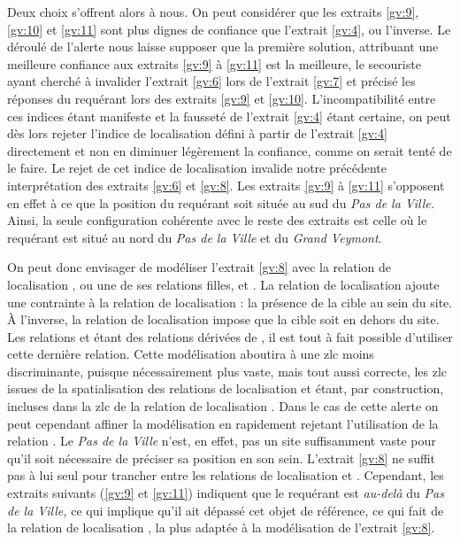 Deux choix s'offrent alors à nous. On peut considérer que les extraits
\ref{gv:9}, \ref{gv:10} et \ref{gv:11} sont plus dignes de confiance
que l'extrait \ref{gv:4}, ou l'inverse. Le déroulé de l'alerte nous
laisse supposer que la première solution, attribuant une meilleure
confiance aux extraits \ref{gv:9} à \ref{gv:11} est la meilleure, le
secouriste ayant cherché à invalider l'extrait \ref{gv:6} lors de
l'extrait \ref{gv:7} et précisé les réponses du requérant lors des
extraits \ref{gv:9} et \ref{gv:10}. L'incompatibilité entre ces
indices étant manifeste et la fausseté de l'extrait \ref{gv:4} étant
certaine, on peut dès lors rejeter l'indice de localisation défini à
partir de l'extrait \ref{gv:4} directement et non en diminuer
légèrement la confiance, comme on serait tenté de le faire. Le rejet
de cet indice de localisation invalide notre précédente interprétation
des extraits \ref{gv:6} et \ref{gv:8}. Les extraits \ref{gv:9} à
\ref{gv:11} s'opposent en effet à ce que la position du requérant soit
située au sud du \emph{Pas de la Ville.} Ainsi, la seule configuration
cohérente avec le reste des extraits est celle où le requérant est
situé au nord du \emph{Pas de la Ville} et du \emph{Grand Veymont}.

On peut donc envisager de modéliser l'extrait \ref{gv:8} avec la
relation de localisation , ou une de ses
relations filles,  et
. La relation de localisation
 ajoute une contrainte à la
relation de localisation  : la présence de la
cible au sein du site. À l'inverse, la relation de localisation
 impose que la cible soit en dehors
du site. Les relations  et
 étant des relations dérivées de
, il est tout à fait possible d'utiliser cette
dernière relation. Cette modélisation aboutira à une \ac{zlc} moins
discriminante, puisque nécessairement plus vaste, mais tout aussi
correcte, les \ac{zlc} issues de la spatialisation des relations de
localisation  et
 étant, par construction, incluses
dans la \ac{zlc} de la relation de localisation
. Dans le cas de cette alerte on peut
cependant affiner la modélisation en rapidement rejetant l'utilisation
de la relation . Le \emph{Pas de
  la Ville} n'est, en effet, pas un site suffisamment vaste pour qu'il
soit nécessaire de préciser sa position en son sein. L'extrait
\ref{gv:8} ne suffit pas à lui seul pour trancher entre les relations
de localisation  et
. Cependant, les extraits suivants
(\ref{gv:9} et \ref{gv:11}) indiquent que le requérant est
\emph{au-delà} du \emph{Pas de la Ville,} ce qui implique qu'il ait
dépassé cet objet de référence, ce qui fait de la relation de
localisation , la plus adaptée à la
modélisation de l'extrait \ref{gv:8}.

